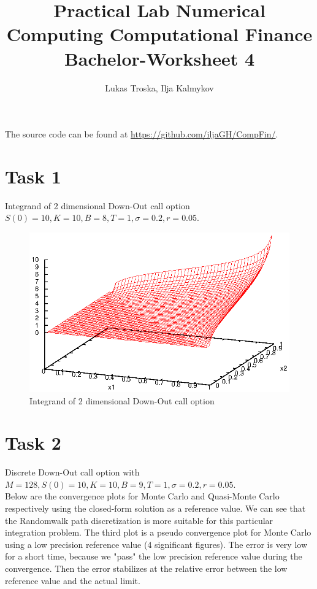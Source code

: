 \documentclass[]{article}
\title{Practical Lab Numerical Computing Computational Finance \\Bachelor-Worksheet 4}
\author{Lukas Troska, Ilja Kalmykov}
\date{}
\begin{document}
\maketitle

The source code can be found at \url{https://github.com/iljaGH/CompFin/}.

\section*{Task 1}
Integrand of 2 dimensional Down-Out call option $S(0)=10,K=10,B=8,T=1,\sigma=0.2,r=0.05$.\\
\begin{figure}[!ht]
\centering
\includegraphics[width=.9\textwidth]{task1.eps}
\caption{Integrand of 2 dimensional Down-Out call option}
\label{fig:Task1}
\end{figure}
\clearpage


\section*{Task 2}
Discrete Down-Out call option with $M=128,S(0)=10,K=10,B=9,T=1,\sigma=0.2,r=0.05$.\\
Below are the convergence plots for Monte Carlo and Quasi-Monte Carlo respectively using the closed-form solution as a reference value. We can see that the Randomwalk path discretization is more suitable for this particular integration problem. The third plot is a pseudo convergence plot for Monte Carlo using a low precision reference value (4 significant figures). The error is very low for a short time, because we "pass" the low precision reference value during the convergence. Then the error stabilizes at the relative error between the low reference value and the actual limit.
\end{document}
